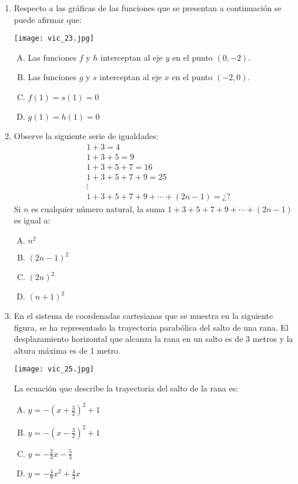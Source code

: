 \begin{enumerate}
\newpage
\item  Respecto a las gráficas de las funciones que se presentan a continuación se puede afirmar que: \label{vic-23}

\texttt{[image: vic\_23.jpg]} 

\begin{enumerate}[(A)]
\item Las funciones $f$ y $h$ interceptan al eje $y$ en el punto $(0, -2)$.
\item  Las funciones $g$ y $s$ interceptan al eje $x$ en el punto $(-2, 0)$.
\item  $f(1) = s(1) = 0$
\item $g(1) = h(1) = 0$ 
\end{enumerate}
\newpage
\item Observe la siguiente serie de igualdades: \label{vic-24}
\begin{align*}
&1+3=4\\
&1+3+5=9\\
&1+3+5+7=16\\
&1+3+5+7+9=25\\
&\vdots\\
&1+3+5+7+9+\cdots +(2n-1)=¿?
\end{align*}
Si $n$ es cualquier número natural, la suma $1+3+5+7+9+\cdots +(2n-1)$
es igual a: 
\begin{enumerate}[(A)]
\item $n^2$
\item $(2n-1)^2$
\item $(2n)^2$
\item $(n+1)^2$
\end{enumerate}


\newpage
\item En el sistema de coordenadas cartesianas que se muestra en la siguiente figura, se ha representado la trayectoria parabólica del salto de una rana. El desplazamiento horizontal que alcanza la rana en un salto es de 3 metros y la altura máxima es de 1 metro. \label{vic-25}

\texttt{[image: vic\_25.jpg]} 

La ecuación que describe la trayectoria  del salto de la rana es:

\begin{enumerate}[(A)]
\item $y=-\left (x+\frac{3}{2}\right )^2+1$
\item $y=-\left (x-\frac{3}{2}\right )^2+1$
\item $y=-\frac{2}{3}x-\frac{5}{3}$
\item $y=-\frac{4}{9}x^2+\frac{4}{3}x$
\end{enumerate}

\end{enumerate}
